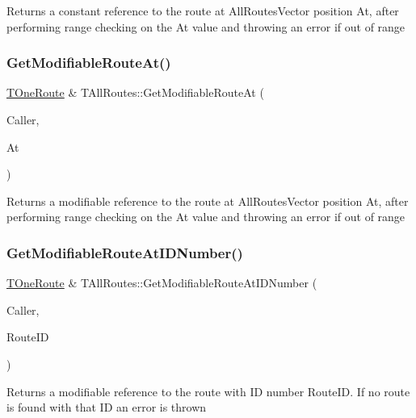 Returns a constant reference to the route at All\+Routes\+Vector position \textquotesingle{}At\textquotesingle{}, after performing range checking on the \textquotesingle{}At\textquotesingle{} value and throwing an error if out of range \mbox{\label{class_t_all_routes_a8b522eb0d7aa415c3648d464c2885484}} 
\subsubsection{\texorpdfstring{Get\+Modifiable\+Route\+At()}{GetModifiableRouteAt()}}
{\footnotesize\ttfamily \mbox{\hyperlink{class_t_one_route}{T\+One\+Route}} \& T\+All\+Routes\+::\+Get\+Modifiable\+Route\+At (\begin{DoxyParamCaption}\item[{int}]{Caller,  }\item[{int}]{At }\end{DoxyParamCaption})}

Returns a modifiable reference to the route at All\+Routes\+Vector position \textquotesingle{}At\textquotesingle{}, after performing range checking on the \textquotesingle{}At\textquotesingle{} value and throwing an error if out of range \mbox{\label{class_t_all_routes_a22bbb69a96356c26848fe9c6b154f387}} 
\subsubsection{\texorpdfstring{Get\+Modifiable\+Route\+At\+I\+D\+Number()}{GetModifiableRouteAtIDNumber()}}
{\footnotesize\ttfamily \mbox{\hyperlink{class_t_one_route}{T\+One\+Route}} \& T\+All\+Routes\+::\+Get\+Modifiable\+Route\+At\+I\+D\+Number (\begin{DoxyParamCaption}\item[{int}]{Caller,  }\item[{\mbox{\hyperlink{class_i_d_int}{I\+D\+Int}}}]{Route\+ID }\end{DoxyParamCaption})}

Returns a modifiable reference to the route with ID number Route\+ID. If no route is found with that ID an error is thrown \mbox{\label{class_t_all_routes_a7eda7a4b535c7538e217bbbc4d878071}} 
